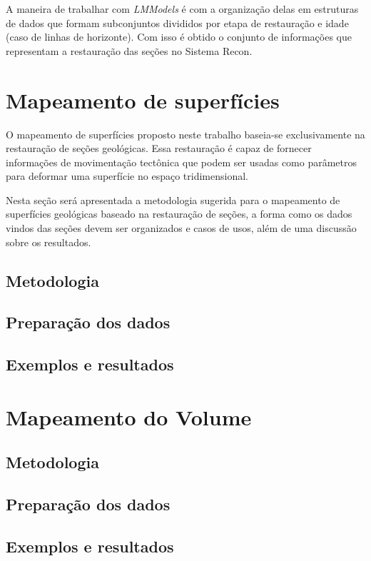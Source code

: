 A maneira de trabalhar com \textit{LMModels} é com a organização delas em estruturas de dados que formam subconjuntos divididos por etapa de restauração e idade (caso de linhas de horizonte). Com isso é obtido o conjunto de informações que representam a restauração das seções no Sistema Recon.


\section{Mapeamento de superfícies}

O mapeamento de superfícies proposto neste trabalho baseia-se exclusivamente na restauração de seções geológicas. Essa restauração é capaz de fornecer informações de movimentação tectônica que podem ser usadas como parâmetros para deformar uma superfície no espaço tridimensional.

Nesta seção será apresentada a metodologia sugerida para o mapeamento de superfícies geológicas baseado na restauração de seções, a forma como os dados vindos das seções devem ser organizados e casos de usos, além de uma discussão sobre os resultados.

\subsection{Metodologia}

\subsection{Preparação dos dados}

\subsection{Exemplos e resultados}

\section{Mapeamento do Volume}

\subsection{Metodologia}

\subsection{Preparação dos dados}

\subsection{Exemplos e resultados}


